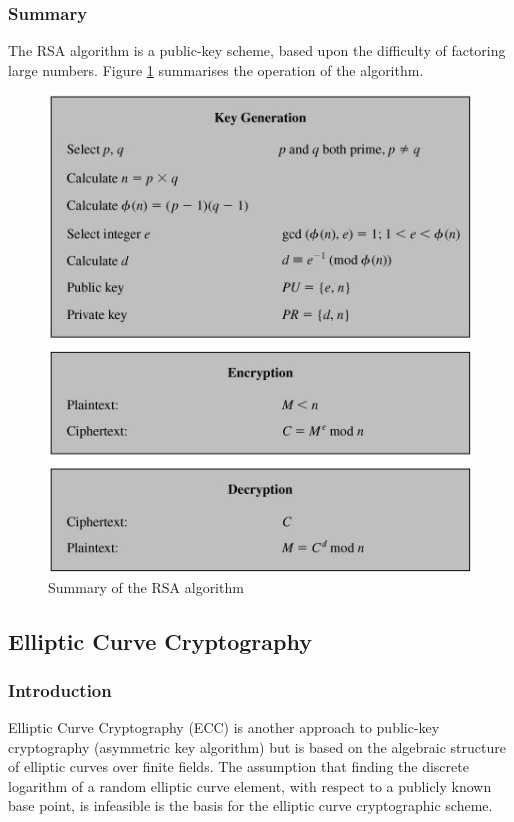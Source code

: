 \documentclass[a4paper,12pt]{report}
\begin{document}
\subsubsection{Summary}

The RSA algorithm is a public-key scheme, based upon the difficulty of factoring large numbers. Figure \ref{fig:rsasum} summarises the operation of the algorithm.

\begin{figure}[htb]
\centering
\includegraphics[scale=0.7]{images/rsasum.jpg}
\caption{Summary of the RSA algorithm}
\label{fig:rsasum}
\end{figure}

\subsection{Elliptic Curve Cryptography}

\subsubsection{Introduction}

Elliptic Curve Cryptography (ECC) is another approach to public-key cryptography (asymmetric key algorithm) but is based on the algebraic structure of elliptic curves over finite fields. The assumption that finding the discrete logarithm of a random elliptic curve element, with respect to a publicly known base point, is infeasible is the basis for the elliptic curve cryptographic scheme.
\end{document}
